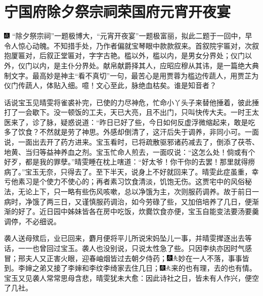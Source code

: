 

\chapter{宁国府除夕祭宗祠\hspace{.5em}荣国府元宵开夜宴}

{\includegraphics[width=3mm]{../Images/00005}  \kaishu ``除夕祭宗祠''一题极博大，``元宵开夜宴''一题极富丽，拟此二题于一回中，早令人惊心动魄。不知措手处，乃作者偏就宝琴眼中款款叙来。首叙院宇匾对，次叙抱厦匾对，后叙正堂匾对，字字古艳。槛以外，槛以内，是男女分界处；仪门以外，仪门以内，是主仆分界处。献帛献爵择其人，应昭应穆从其讳，是一篇绝大典制文字。最高妙是神主``看不真切''一句，最苦心是用贾蓉为槛边传蔬人，用贾芷为仪门传蔬人，体贴入细。噫！文心至此，脉绝血枯矣。谁是知音者？}

话说宝玉见晴雯将雀裘补完，已使的力尽神危，忙命小丫头子来替他捶着，彼此捶打了一会歇下。没一顿饭的工夫，天已大亮，且不出门，只叫快传大夫。一时王太医来了，诊了脉，疑惑说道：``昨日已好了些，今日如何反虚浮微缩起来，敢是吃多了饮食？不然就是劳了神思。外感却倒清了，这汗后失于调养，非同小可。一面说，一面出去开了药方进来。宝玉看时，已将疏散驱邪诸药减去了，倒添了茯苓、地黄、当归等益神养血之剂。宝玉忙命人煎去，一面叹说：``这怎么处！倘或有个好歹，都是我的罪孽。''晴雯睡在枕上嗐道：``好太爷！你干你的去罢！那里就得痨病了。''宝玉无奈，只得去了。至下半天，说身上不好就回来了。晴雯此症虽重，幸亏他素习是个使力不使心的；再者素习饮食清淡，饥饱无伤。这贾宅中的风俗秘法，无论上下，只一略有些伤风咳嗽，总以净饿为主，次则服药调养。故于前日一病时，净饿了两三日，又谨慎服药调治，如今劳碌了些，又加倍培养了几日，便渐渐的好了。近日园中姊妹皆各在房中吃饭，炊爨饮食亦便，宝玉自能变法要汤要羹调停，不必细说。

袭人送母殡后，业已回来，麝月便将平儿所说宋妈坠儿一事，并晴雯撵逐出去等话，一一也曾回过宝玉。袭人也没别说，只说太性急了些。只因李纨亦因时气感冒；邢夫人又正害火眼，迎春岫烟皆过去朝夕侍药；{\includegraphics[width=3mm]{../Images/00004}\includegraphics[width=3mm]{../Images/00012}\footnotesize \kaishu 妙在一人不落，事事皆到。}李婶之弟又接了李婶和李纹李绮家去住几日；{\includegraphics[width=3mm]{../Images/00004}\includegraphics[width=3mm]{../Images/00012}\footnotesize \kaishu 来的也有理，去的也有情。}宝玉又见袭人常常思母含悲，晴雯犹未大愈：因此诗社之日，皆未有人作兴，便空了几社。

